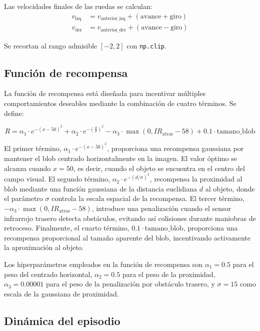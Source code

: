\documentclass[12pt,a4paper]{article}
\begin{document}
Las velocidades finales de las ruedas se calculan:
\begin{align}
v_{\text{izq}} &= v_{\text{anterior\_izq}} + (\text{avance} + \text{giro}) \\
v_{\text{der}} &= v_{\text{anterior\_der}} + (\text{avance} - \text{giro})
\end{align}

Se recortan al rango admisible $[-2, 2]$ con \texttt{np.clip}.

\subsection{Función de recompensa}

La función de recompensa está diseñada para incentivar múltiples comportamientos
deseables mediante la combinación de cuatro términos. Se define:

\begin{equation}
R = \alpha_1 \cdot e^{-(x-50)^2} + \alpha_2 \cdot e^{-\left(\frac{d}{\sigma}\right)^2} - \alpha_3 \cdot \max(0, IR_{\text{atras}} - 58) + 0.1 \cdot \text{tamano\_blob}
\end{equation}

El primer término, $\alpha_1 \cdot e^{-(x-50)^2}$, proporciona una recompensa gaussiana por mantener el blob centrado horizontalmente en la imagen. El valor óptimo se alcanza cuando $x = 50$, es decir, cuando el objeto se encuentra en el centro del campo visual. El segundo término, $\alpha_2 \cdot e^{-(d/\sigma)^2}$, recompensa la proximidad al blob mediante una función gaussiana de la distancia euclidiana $d$ al objeto, donde el parámetro $\sigma$ controla la escala espacial de la recompensa. El tercer término, $-\alpha_3 \cdot \max(0, IR_{\text{atras}} - 58)$, introduce una penalización cuando el sensor infrarrojo trasero detecta obstáculos, evitando así colisiones durante maniobras de retroceso. Finalmente, el cuarto término, $0.1 \cdot \text{tamano\_blob}$, proporciona una recompensa proporcional al tamaño aparente del blob, incentivando activamente la aproximación al objeto.

Los hiperparámetros empleados en la función de recompensa son $\alpha_1 = 0.5$
para el peso del centrado horizontal, $\alpha_2 = 0.5$ para el peso de la
proximidad, $\alpha_3 = 0.00001$ para el peso de la penalización por obstáculo
trasero, y $\sigma = 15$ como escala de la gaussiana de proximidad.

\subsection{Dinámica del episodio}
\end{document}
